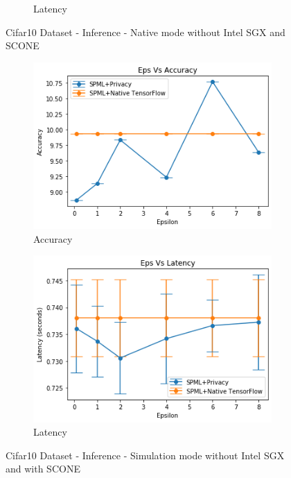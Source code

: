 \begin{figure}
\begin{subfigure}{0.5\textwidth}
         \caption{Latency}
         \label{fig:nativeCifar10LatencyInference}
     \end{subfigure}
        \caption{Cifar10 Dataset - Inference - Native mode without Intel SGX and SCONE}
     \begin{subfigure}{0.5\textwidth}
         \includegraphics[width=\textwidth]{images/Inference/Cifar10SimAccuracyInference.png}
         \caption{Accuracy}
         \label{fig:simCifar10AccuracyInference}
     \end{subfigure}
     \begin{subfigure}{0.5\textwidth}
         \includegraphics[width=\textwidth]{images/Inference/Cifar10SimLatencyInference.png}
         \caption{Latency}
         \label{fig:simCifar10LatencyInference}
     \end{subfigure}
        \caption{Cifar10 Dataset - Inference - Simulation mode without Intel SGX and with SCONE}

\end{figure}
